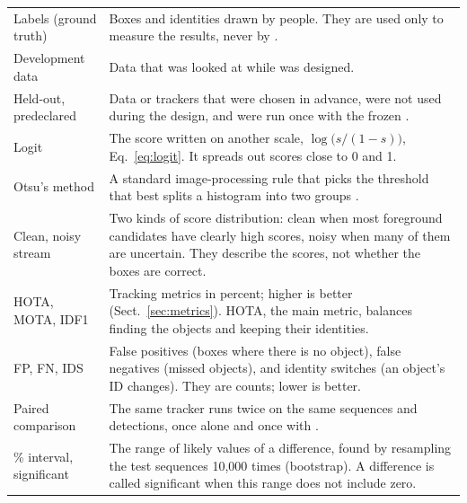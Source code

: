 \begin{table}[t]
\begin{tabular}{@{}>{\raggedright\arraybackslash}p{32mm}>{\raggedright\arraybackslash}p{123mm}@{}}
Labels (ground truth) & Boxes and identities drawn by people. They are used only to measure the results, never by \scl{}.\\
Development data & Data that was looked at while \scl{} was designed.\\
Held-out, predeclared & Data or trackers that were chosen in advance, were not used during the design, and were run once with the frozen \scl{}.\\
Logit & The score written on another scale, $\log\bigl(s/(1-s)\bigr)$, Eq.~\eqref{eq:logit}. It spreads out scores close to 0 and 1.\\
Otsu's method & A standard image-processing rule that picks the threshold that best splits a histogram into two groups \cite{otsu1979}.\\
Clean, noisy stream & Two kinds of score distribution: clean when most foreground candidates have clearly high scores, noisy when many of them are uncertain. They describe the scores, not whether the boxes are correct.\\
HOTA, MOTA, IDF1 & Tracking metrics in percent; higher is better (Sect.~\ref{sec:metrics}). HOTA, the main metric, balances finding the objects and keeping their identities.\\
FP, FN, IDS & False positives (boxes where there is no object), false negatives (missed objects), and identity switches (an object's ID changes). They are counts; lower is better.\\
Paired comparison & The same tracker runs twice on the same sequences and detections, once alone and once with \scl{}.\\
95\% interval, significant & The range of likely values of a difference, found by resampling the test sequences 10,000 times (bootstrap). A difference is called significant when this range does not include zero.\\
\bottomrule
\end{tabular}
\end{table}
